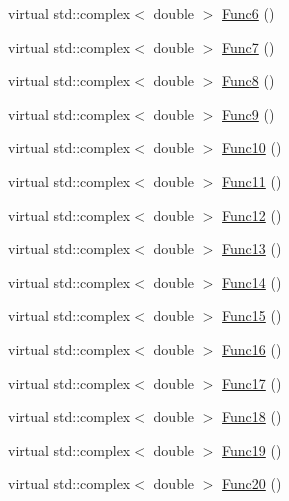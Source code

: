 \begin{DoxyCompactItemize}
\item 
virtual std\-::complex$<$ double $>$ \hyperlink{classosea_1_1ofreq_1_1_equationof_motion_aecb9d2662b2fc77143649ebbeaddb5af}{Func6} ()
\item 
virtual std\-::complex$<$ double $>$ \hyperlink{classosea_1_1ofreq_1_1_equationof_motion_a99c266e01afc3f20b7154db38344a050}{Func7} ()
\item 
virtual std\-::complex$<$ double $>$ \hyperlink{classosea_1_1ofreq_1_1_equationof_motion_a20b071061e22794f809e8e4a711385a9}{Func8} ()
\item 
virtual std\-::complex$<$ double $>$ \hyperlink{classosea_1_1ofreq_1_1_equationof_motion_aa5544ff6b4afe0982124ba173392cde6}{Func9} ()
\item 
virtual std\-::complex$<$ double $>$ \hyperlink{classosea_1_1ofreq_1_1_equationof_motion_a9d087d68b0af5a5c923cf624ba2ca25d}{Func10} ()
\item 
virtual std\-::complex$<$ double $>$ \hyperlink{classosea_1_1ofreq_1_1_equationof_motion_a93650f458441e585dbe6bae34934a5ca}{Func11} ()
\item 
virtual std\-::complex$<$ double $>$ \hyperlink{classosea_1_1ofreq_1_1_equationof_motion_a73499ca765a883d14483f0894cb99d6b}{Func12} ()
\item 
virtual std\-::complex$<$ double $>$ \hyperlink{classosea_1_1ofreq_1_1_equationof_motion_ab0a6e7f35c1ee774c67c348f63218161}{Func13} ()
\item 
virtual std\-::complex$<$ double $>$ \hyperlink{classosea_1_1ofreq_1_1_equationof_motion_a95dd987ce8564fc96f3c4dfd1b00da72}{Func14} ()
\item 
virtual std\-::complex$<$ double $>$ \hyperlink{classosea_1_1ofreq_1_1_equationof_motion_a6fb116fda50fff5f6a551033809866bc}{Func15} ()
\item 
virtual std\-::complex$<$ double $>$ \hyperlink{classosea_1_1ofreq_1_1_equationof_motion_aad2958f7e57f06d5b7a9f807d565bbc7}{Func16} ()
\item 
virtual std\-::complex$<$ double $>$ \hyperlink{classosea_1_1ofreq_1_1_equationof_motion_a9b2c9a471dbc0d48ddf025a8a0c55f1f}{Func17} ()
\item 
virtual std\-::complex$<$ double $>$ \hyperlink{classosea_1_1ofreq_1_1_equationof_motion_a3cbd356ecdd5bc045dc98421d6283170}{Func18} ()
\item 
virtual std\-::complex$<$ double $>$ \hyperlink{classosea_1_1ofreq_1_1_equationof_motion_a27e79b31834844a40c870436ac62ae73}{Func19} ()
\item 
virtual std\-::complex$<$ double $>$ \hyperlink{classosea_1_1ofreq_1_1_equationof_motion_a7232042c946e1e2fd2c5d6e9e5929300}{Func20} ()

\end{DoxyCompactItemize}
